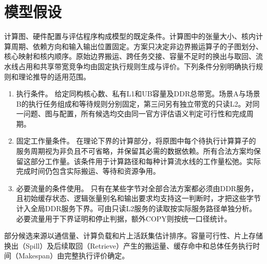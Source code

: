 \section{模型假设}

计算图、硬件配置与评估程序构成模型的既定条件。计算图中的张量大小、核内计算周期、依赖方向和输入输出位置固定。方案只决定非边界搬运算子的子图划分、核心映射和核内顺序。原始边界搬运、跨任务交接、容量不足时的换出与取回、流水线占用和共享带宽竞争均由固定执行规则生成与评价。下列条件分别明确执行规则和理论推导的适用范围。

\begin{enumerate}
  \item 执行条件。 给定同构核心数、私有L1和UB容量及DDR总带宽。场景A与场景B的执行任务组成和等待规则分别固定，第三问另有独立带宽的只读L2。对同一问题、图与配置，所有候选均交由同一官方评估语义判定可行性和完成周期。
  \item 固定工作量条件。 在理论下界的计算部分，将原图中每个待执行计算算子的服务周期视为非负且不可省略，并保留其必需的数据依赖。所有合法方案均保留这部分工作量。该条件用于计算路径和每种计算流水线的工作量松弛。实际完成时间仍包含实际搬运、等待和资源争用。
  \item 必要流量的条件使用。 只有在某些字节对全部合法方案都必须由DDR服务，且初始缓存状态、逻辑张量别名和输出要求均支持这一判断时，才把这些字节计入全局DDR服务下界。可由只读L2服务的读取按实际服务路径单独分析。必要流量用于下界证明和停止判据，额外COPY则按统一口径统计。
\end{enumerate}

部分候选来源以通信量、计算负载和片上活跃集估计排序。容量可行性、片上存储换出（Spill）及后续取回（Retrieve）产生的搬运量、缓存命中和总体任务执行时间（Makespan）由完整执行评价确定。

